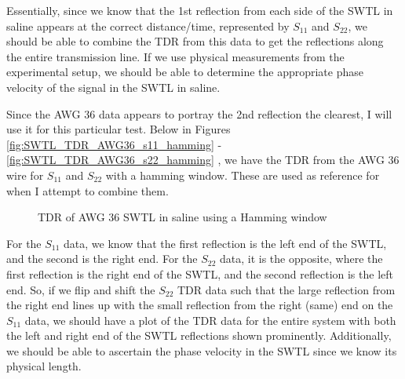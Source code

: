 \documentclass[12pt,onecolumn,titlepage]{article}
\begin{document}
Essentially, since we know that the 1st reflection from each side of the SWTL in saline appears at the correct distance/time, represented by $S_{11}$ and $S_{22}$, we should be able to combine the TDR from this data to get the reflections along the entire transmission line. If we use physical measurements from the experimental setup, we should be able to determine the appropriate phase velocity of the signal in the SWTL in saline.

Since the AWG 36 data appears to portray the 2nd reflection the clearest, I will use it for this particular test. Below in Figures \ref{fig:SWTL_TDR_AWG36_s11_hamming} - \ref{fig:SWTL_TDR_AWG36_s22_hamming} , we have the TDR from the AWG 36 wire for $S_{11}$ and $S_{22}$ with a hamming window. These are used as reference for when I attempt to combine them.



\begin{figure}[htbp]
	\centering
		\quad
	\label{fig:SWTL_TDR_hamming}
	\caption{TDR of AWG 36 SWTL in saline using a Hamming window }
\end{figure}


For the $S_{11}$ data, we know that the first reflection is the left end of the SWTL, and the second is the right end. For the $S_{22}$ data, it is the opposite, where the first reflection is the right end of the SWTL, and the second reflection is the left end. So, if we flip and shift the $S_{22}$ TDR data such that the large reflection from the right end lines up with the small reflection from the right (same) end on the $S_{11}$ data, we should have a plot of the TDR data for the entire system with both the left and right end of the SWTL reflections shown prominently. Additionally, we should be able to ascertain the phase velocity in the SWTL since we know its physical length.
\end{document}
